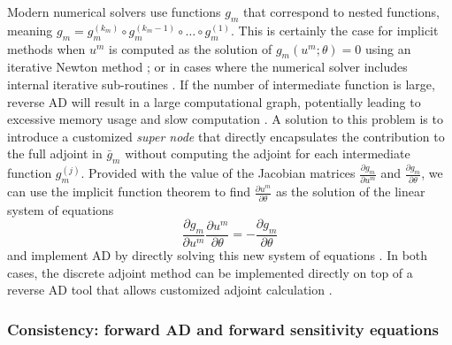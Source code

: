 Modern numerical solvers use functions $g_m$ that correspond to nested functions, meaning $g_m = g_m^{(k_m)} \circ g_m^{(k_m-1)} \circ \ldots \circ g_m^{(1)}$. 
This is certainly the case for implicit methods when $u^{m}$ is computed as the solution of $g_m(u^m; \theta) = 0$ using an iterative Newton method \cite{SUNDIALS-hindmarsh2005sundials}; or in cases where the numerical solver includes internal iterative sub-routines \cite{Alexe_Sandu_2009}.
If the number of intermediate function is large, reverse AD will result in a large computational graph, potentially leading to excessive memory usage and slow computation \cite{Margossian.2019, Alexe_Sandu_2009}.
A solution to this problem is to introduce a customized \textit{super node} that directly encapsulates the contribution to the full adjoint in $\bar g_m$ without computing the adjoint for each intermediate function $g_m^{(j)}$.
Provided with the value of the Jacobian matrices $\frac{\partial g_m}{\partial u^m}$ and $\frac{\partial g_m}{\partial \theta}$, we can use the implicit function theorem to find $\frac{\partial u^m}{\partial \theta}$ as the solution of the linear system of equations
\begin{equation}
    \frac{\partial g_m}{\partial u^m} \frac{\partial u^m}{\partial \theta} = -\frac{\partial g_m}{\partial \theta}
\end{equation}
and implement AD by directly solving this new system of equations \cite{christianson1994reverse, christianson1998reverse, Bell_Burke_2008}. 
In both cases, the discrete adjoint method can be implemented directly on top of a reverse AD tool that allows customized adjoint calculation \cite{rackauckas2021generalized}. 


\subsubsection{Consistency: forward AD and forward sensitivity equations}
\label{section:forwardAD-sensitivity}

